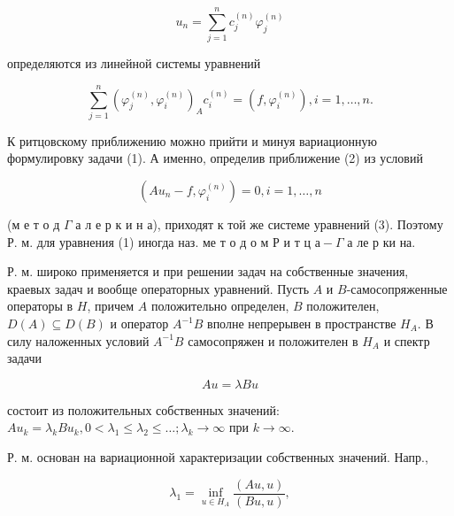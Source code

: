\documentclass[10pt]{article}
\begin{document}
\[

u_{n}=\sum_{j=1}^{n} c_{j}^{(n)} \varphi_{j}^{(n)}

\]



определяются из линейной системы уравнений



\[

\sum_{j=1}^{n}\left(\varphi_{j}^{(n)}, \varphi_{i}^{(n)}\right)_{A} c_{i}^{(n)}=\left(f, \varphi_{i}^{(n)}\right), i=1, \ldots, n .

\]



К ритцовскому приближению можно прийти и минуя вариационную формулировку задачи (1). А именно, определив приближение (2) из условий



\[

\left(A u_{n}-f, \varphi_{i}^{(n)}\right)=0, i=1, \ldots, n

\]



(м е т о д $\Gamma$ а л е р к и н а), приходят к той же системе уравнений (3). Поэтому Р. м. для уравнения (1) иногда наз. ме т о д о м Р и т ц $а-\Gamma$ а ле р ки на.



Р. м. широко применяется и при решении задач на собственные значения, краевых задач и вообще операторных уравнений. Пусть $A$ и $B$-самосопряженные операторы в $H$, причем $A$ положительно определен, $B$ положителен, $D(A) \subseteq D(B)$ и оператор $A^{-1} B$ вполне непрерывен в пространстве $H_{A}$. В силу наложенных условий $A^{-1} B$ самосопряжен и положителен в $H_{A}$ и спектр задачи



\[

A u=\lambda B u

\]



состоит из положительных собственных значений: $A u_{k}=\lambda_{k} B u_{k}, 0<\lambda_{1} \leqslant \lambda_{2} \leqslant \ldots ; \lambda_{k} \rightarrow \infty$ при $k \rightarrow \infty$.



Р. м. основан на вариационной характеризации собственных значений. Напр.,



\[

\lambda_{1}=\inf _{u \in H_{A}} \frac{(A u, u)}{(B u, u)},

\]
\end{document}
